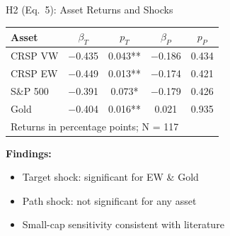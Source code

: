 \documentclass[aspectratio=169, 11pt]{beamer}
\begin{document}
\begin{frame}{H2 (Eq.\ 5): Asset Returns and Shocks}
  \centering
  \begin{tabular}{lcccc}
    \toprule
    Asset & $\beta_T$ & $p_T$ & $\beta_P$ & $p_P$ \\
    \midrule
    CRSP VW & $-$0.435 & 0.043** & $-$0.186 & 0.434 \\
    CRSP EW & $-$0.449 & 0.013** & $-$0.174 & 0.421 \\
    S\&P 500 & $-$0.391 & 0.073* & $-$0.179 & 0.426 \\
    Gold    & $-$0.404 & 0.016** & 0.021 & 0.935 \\
    \bottomrule
    \multicolumn{5}{l}{\scriptsize Returns in percentage points; N = 117}
  \end{tabular}

  \vspace{0.5em}
  \textbf{Findings:}
  \begin{itemize}
    \item Target shock: significant for EW \& Gold
    \item Path shock: not significant for any asset
    \item Small-cap sensitivity consistent with literature
  \end{itemize}
\end{frame}
\end{document}
